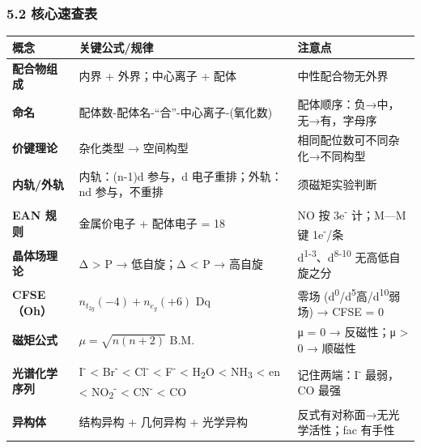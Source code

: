 \documentclass[a4paper,11pt]{ctexart}
\newcounter{none}
\begin{document}
\subsubsection{5.2 核心速查表}\label{ux6838ux5fc3ux901fux67e5ux8868}

{\def\LTcaptype{none} %
\begin{longtable}[]{@{}
  >{\raggedright\arraybackslash}p{}
  >{\raggedright\arraybackslash}p{}
  >{\raggedright\arraybackslash}p{}@{}}
\toprule\noalign{}
\begin{minipage}[b]{\linewidth}\raggedright
概念
\end{minipage} & \begin{minipage}[b]{\linewidth}\raggedright
关键公式/规律
\end{minipage} & \begin{minipage}[b]{\linewidth}\raggedright
注意点
\end{minipage} \\
\midrule\noalign{}
\endhead
\bottomrule\noalign{}
\endlastfoot
\textbf{配合物组成} & 内界 + 外界；中心离子 + 配体 & 中性配合物无外界 \\
\textbf{命名} & 配体数-配体名-``合''-中心离子-(氧化数) & 配体顺序：负→中，无→有，字母序 \\
\textbf{价键理论} & 杂化类型 → 空间构型 & 相同配位数可不同杂化→不同构型 \\
\textbf{内轨/外轨} & 内轨：(n-1)d 参与，d 电子重排；外轨：nd 参与，不重排 & 须磁矩实验判断 \\
\textbf{EAN 规则} & 金属价电子 + 配体电子 = 18 & NO 按 3e\textsuperscript{-} 计；M---M 键 1e\textsuperscript{-}/条 \\
\textbf{晶体场理论} & Δ \textgreater{} P → 低自旋；Δ \textless{} P → 高自旋 & d\textsuperscript{1-3}、d\textsuperscript{8-10} 无高低自旋之分 \\
\textbf{CFSE（Oh）} & \(n_{t_{2g}}(-4) + n_{e_g}(+6)\) Dq & 零场 (d\textsuperscript{0}/d\textsuperscript{5}高/d\textsuperscript{10}弱场) → CFSE = 0 \\
\textbf{磁矩公式} & \(\mu = \sqrt{n(n+2)}\) B.M. & μ = 0 → 反磁性；μ \textgreater{} 0 → 顺磁性 \\
\textbf{光谱化学序列} & I\textsuperscript{-} \textless{} Br\textsuperscript{-} \textless{} Cl\textsuperscript{-} \textless{} F\textsuperscript{-} \textless{} H\textsubscript{2}O \textless{} NH\textsubscript{3} \textless{} en \textless{} NO\textsubscript{2}\textsuperscript{-} \textless{} CN\textsuperscript{-} \textless{} CO & 记住两端：I\textsuperscript{-} 最弱，CO 最强 \\
\textbf{异构体} & 结构异构 + 几何异构 + 光学异构 & 反式有对称面→无光学活性；fac 有手性 \\
\end{longtable}
}
\end{document}

